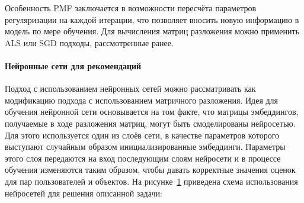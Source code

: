 \vspace{0.5em}
Особенность PMF заключается в возможности пересчёта параметров регуляризации на каждой итерации, что позволяет вносить новую информацию в модель по мере обучения.
Для вычисления матриц разложения можно применить ALS или SGD подходы, рассмотренные ранее.

\pagebreak
\paragraph{Нейронные сети для рекомендаций}

Подход с использованием нейронных сетей можно рассматривать как модификацию подхода с использованием матричного разложения.
Идея для обучения нейронной сети основывается на том факте, что матрицы эмбеддингов, получаемые в ходе разложения матриц, могут быть смоделированы нейросетью.
Для этого используется один из слоёв сети, в качестве параметров которого выступают случайным образом инициализированные эмбеддинги.
Параметры этого слоя передаются на вход последующим слоям нейросети и в процессе обучения изменяются таким образом, чтобы давать корректные значения оценок для пар пользователей и объектов.
На рисунке~\ref{fig:nn_idea} приведена схема использования нейросетей для решения описанной задачи:

\begin{figure}[h!]
\caption{}
\label{fig:nn_idea}
\end{figure}

